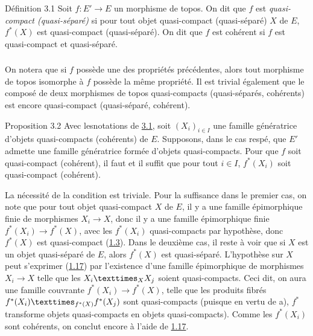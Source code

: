 \documentclass[10pt]{../fichiers-configuration-latex/smfart}
\begin{document}
\begin{enonce*}{Définition 3.1}
Soit $f : E'\to E$ un morphisme de topos. On dit que $f$ est
\emph{quasi-compact (\resp quasi-séparé)} si pour tout objet quasi-compact
(\resp quasi-séparé) $X$ de $E$, $f^{\ast} (X)$ est quasi-compact
(\resp quasi-séparé). On dit que $f$ est cohérent si $f$ est
quasi-compact et quasi-séparé.
\end{enonce*}

\setcounter{subsection}{1}
\setcounter{subsubsection}{0}
\subsubsection{}
On notera que si $f$ possède une des propriétés précédentes, alors
tout morphisme de topos isomorphe à $f$ possède la même propriété. Il
est trivial également que le composé de deux morphismes de topos
quasi-compacts (\resp quasi-séparés, \resp cohérents) est encore
quasi-compact (\resp quasi-séparé, \resp cohérent).

\begin{enonce*}{Proposition 3.2}
Avec les\pageoriginale notations de \hyperref[VI.def3.1]{3.1}, soit $(X_i)_{i \in I}$ une famille
génératrice d'objets quasi-compacts (\resp cohérents) de
$E$. Supposons, dans le cas respé, que $E'$ admette une famille
génératrice formée d'objets quasi-compacts. Pour que $f$ soit
quasi-compact (\resp cohérent), il faut et il suffit que pour tout $i
\in I$, $f^{\ast}(X_i)$ soit quasi-compact (\resp cohérent).
\end{enonce*}

La nécessité de la condition est triviale. Pour la suffisance dans
le premier cas, on note que pour tout objet quasi-compact $X$ de
$E$, il y a une famille épimorphique finie de morphismes $X_i \to
X$, donc il y a une famille épimorphique finie $f^{\ast} (X_i) \to
f^{\ast}(X)$, avec les $f^{\ast}(X_i)$ quasi-compacts par hypothèse,
donc $f^{\ast}(X)$ est quasi-compact (\hyperref[VI.prop1.3]{1.3}). Dans le
deuxième cas, il reste à voir que si $X$ est un objet quasi-séparé
de $E$, alors $f^{\ast}(X)$ est quasi-séparé. L'hypothèse sur $X$
peut s'exprimer (\hyperref[VI.cor1.17]{1.17}) par l'existence d'une famille
épimorphique de morphismes $X_i \to X$ telle que les
$\fprod{X_i}{X_j}{X}$ soient quasi-compacts. Ceci dit, on aura une
famille couvrante $f^{\ast}(X_i) \to f^{\ast}(X)$, telle que les
produits fibrés $\fprod{f^{\ast}(X_i)}{f^{\ast}(X_j)}{f^{\ast}(X)}$
sont quasi-compacts (puisque en vertu de a), $f^{\ast}$ transforme
objets quasi-compacts en objets quasi-compacts). Comme les
$f^{\ast}(X_i)$ sont cohérents, on conclut encore à l'aide de
\hyperref[VI.cor1.17]{1.17}.
\end{document}
